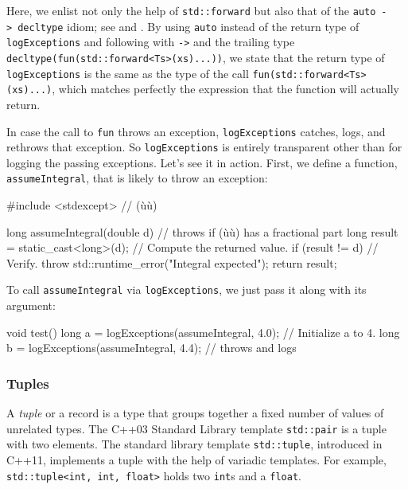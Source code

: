 \noindent Here, we enlist not only the help of \lstinline!std::forward! but also that
of the \lstinline!auto!~\lstinline!->!~\lstinline!decltype! idiom; see
 and
. By using \lstinline!auto! instead of the
return type of \lstinline!logExceptions! and following with \lstinline!->! and
the trailing type \lstinline!decltype(fun(std::forward<Ts>(xs)...))!, we
state that the return type of \lstinline!logExceptions! is the same as the
type of the call \lstinline!fun(std::forward<Ts>(xs)...)!, which matches
perfectly the expression that the function will actually return.

In case the call to \lstinline!fun! throws an exception,
\lstinline!logExceptions! catches, logs, and rethrows that exception. So
\lstinline!logExceptions! is entirely transparent other than for logging
the passing exceptions. Let's see it in action. First, we define a
function, \lstinline!assumeIntegral!, that is likely to throw an exception:

\begin{emcppslisting}[emcppsbatch=e36]
#include <stdexcept>  // (ù{}ù)

long assumeIntegral(double d)            // throws if (ù{}ù) has a fractional part
{
    long result = static_cast<long>(d);  // Compute the returned value.
    if (result != d)                     // Verify.
        throw std::runtime_error("Integral expected");
    return result;
}
\end{emcppslisting}
    

\noindent To call \lstinline!assumeIntegral! via \lstinline!logExceptions!, we just pass
it along with its argument:

\begin{emcppslisting}[emcppsbatch=e36]
void test()
{
    long a = logExceptions(assumeIntegral, 4.0);  // Initialize a to 4.
    long b = logExceptions(assumeIntegral, 4.4);  // throws and logs
}
\end{emcppslisting}
    

\subsubsection[Tuples]{Tuples}\label{tuples}

A \emph{tuple} or a record is a type that groups together a fixed number
of values of unrelated types. The C++03 Standard Library template
\lstinline!std::pair! is a tuple with two elements. The standard library
template \lstinline!std::tuple!, introduced in C++11, implements a tuple
with the help of variadic templates. For example,
\lstinline!std::tuple<int,!~\lstinline!int,!~\lstinline!float>! holds two
\lstinline!int!s and a \lstinline!float!.

